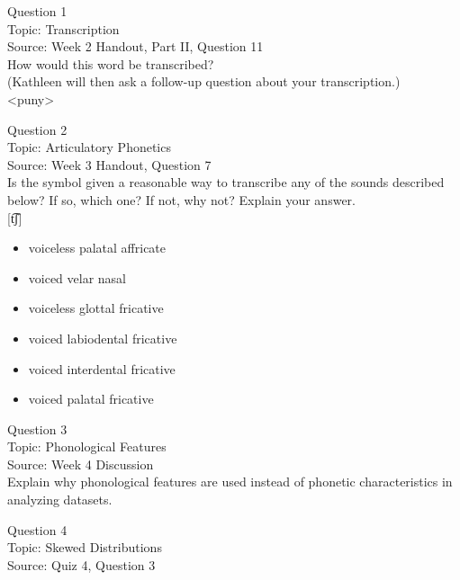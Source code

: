 \documentclass[12pt]{article}
\begin{document}
{\large Question 1}\\

Topic: Transcription\\
Source: Week 2 Handout, Part II, Question 11\\

How would this word be transcribed?\\ (Kathleen will then ask a follow-up question about your transcription.)\\

<puny>


\newpage

{\large Question 2}\\

Topic: Articulatory Phonetics\\
Source: Week 3 Handout, Question 7\\

Is the symbol given a reasonable way to transcribe any of the sounds described below? If so, which one? If not, why not? Explain your answer.\\

{[t͡ʃ]}

\begin{itemize} \item voiceless palatal affricate \item voiced velar nasal \item voiceless glottal fricative \item voiced labiodental fricative \item voiced interdental fricative \item voiced palatal fricative \end{itemize}


\newpage

{\large Question 3}\\

Topic: Phonological Features\\
Source: Week 4 Discussion\\

Explain why phonological features are used instead of phonetic characteristics in analyzing datasets.\\


\newpage

{\large Question 4}\\

Topic: Skewed Distributions\\
Source: Quiz 4, Question 3\\
\end{document}
